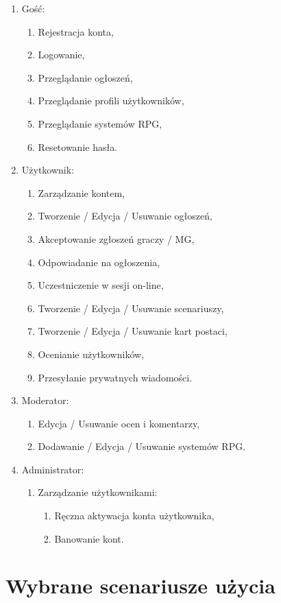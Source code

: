 \begin{enumerate}
\item Gość:
	\begin{enumerate}
	\item Rejestracja konta,
	\item Logowanie,
	\item Przeglądanie ogłoszeń,
	\item Przeglądanie profili użytkowników,
	\item Przeglądanie systemów RPG,
	\item Resetowanie hasła.
	\end{enumerate}
\item Użytkownik:
	\begin{enumerate}
	\item Zarządzanie kontem,
	\item Tworzenie / Edycja / Usuwanie ogłoszeń,
	\item Akceptowanie zgłoszeń graczy / MG,
	\item Odpowiadanie na ogłoszenia,
	\item Uczestniczenie w sesji on-line,
	\item Tworzenie / Edycja / Usuwanie scenariuszy,
	\item Tworzenie / Edycja / Usuwanie kart postaci,
	\item Ocenianie użytkowników,
	\item Przesyłanie prywatnych wiadomości.
	\end{enumerate}
\item Moderator:
	\begin{enumerate}
	\item Edycja / Usuwanie ocen i komentarzy,
	\item Dodawanie / Edycja / Usuwanie systemów RPG.
	\end{enumerate}
\item Administrator:
	\begin{enumerate}
	\item Zarządzanie użytkownikami:
		\begin{enumerate}
		\item Ręczna aktywacja konta użytkownika,
		\item Banowanie kont.
		\end{enumerate}
	\end{enumerate}
\end{enumerate}



\clearpage
\section{Wybrane scenariusze użycia}
\label{sec:scenariusze}

